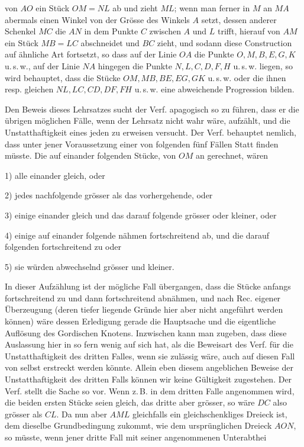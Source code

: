 %
von \(AO\) ein Stück \(OM=NL\) ab und zieht \(ML\); wenn man ferner in \(M\) an \(MA\) abermals einen Winkel von der Grösse des Winkels \(A\) setzt, dessen anderer Schenkel \(MC\) die \(AN\) in dem Punkte \(C\) zwischen \(A\) und \(L\) trifft, hierauf von \(AM\) ein Stück \(MB=LC\) abschneidet und \(BC\) zieht, und sodann diese Construction auf ähnliche Art fortsetzt, so dass auf der Linie \(OA\) die Punkte \(O,M,B,E,G,K\) u.\,s.\,w., auf der Linie \(NA\) hingegen die Punkte \(N,L,C,D,F,H\) u.\,s.\,w. liegen, so wird behauptet, dass die Stücke \(OM,MB,BE,EG,GK\) u.\,s.\,w. oder die ihnen resp. gleichen \(NL,LC,CD,DF,FH\) u.\,s.\,w. eine abweichende Progression bilden.

Den Beweis dieses Lehrsatzes sucht der Verf. apagogisch so zu führen, dass er die übrigen möglichen Fälle, wenn der Lehrsatz nicht wahr wäre, aufzählt, und die Unstatthaftigkeit eines jeden zu erweisen versucht. Der Verf. behauptet nemlich, dass unter jener Voraussetzung einer von folgenden fünf Fällen Statt finden müsste. Die auf einander folgenden Stücke, von \(OM\) an gerechnet, wären
\par\noindent\hspace*{\parindent}1) alle einander gleich, oder
\par\noindent\hspace*{\parindent}2) jedes nachfolgende grösser als das vorhergehende, oder
\par\noindent\hspace*{\parindent}3) einige einander gleich und das darauf folgende grösser oder kleiner, oder
\par\noindent\hspace*{\parindent}4) einige auf einander folgende nähmen fortschreitend ab, und die darauf folgenden fortschreitend zu oder
\par\noindent\hspace*{\parindent}5) sie würden abwechselnd grösser und kleiner.
\par\noindent In dieser Aufzählung ist der mögliche Fall übergangen, dass die Stücke anfangs fortschreitend zu und dann fortschreitend abnähmen, und nach Rec. eigener Überzeugung (deren tiefer liegende Gründe hier aber nicht angeführt werden können) wäre dessen Erledigung gerade die Hauptsache und die eigentliche Auflösung des Gordischen Knotens. Inzwischen kann man zugeben, dass diese Auslassung hier in so fern wenig auf sich hat, als die Beweisart des Verf. für die Unstatthaftigkeit des dritten Falles, wenn sie zulässig wäre, auch auf diesen Fall von selbst erstreckt werden könnte. Allein eben diesem angeblichen Beweise der Unstatthaftigkeit des dritten Falls können wir keine Gültigkeit zugestehen. Der Verf. stellt die Sache so vor. Wenn z.\,B. in dem dritten Falle angenommen wird, die beiden ersten Stücke seien gleich, das dritte aber grösser, so wäre \(DC\) also grösser als \(CL\). Da nun aber \(AML\) gleichfalls ein gleichschenkliges Dreieck ist, dem dieselbe Grundbedingung zukommt, wie dem ursprünglichen Dreieck \(AON\), so müsste, wenn jener dritte Fall mit seiner angenommenen Unterabthei%
